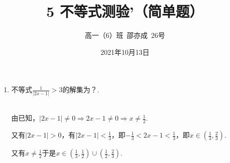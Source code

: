 \documentclass[8pt]{article}
\author{高一（6）班\ 邵亦成\ 26号}
\title{5 不等式测验'（简单题）}
\date{2021年10月13日}
\begin{document}
	\maketitle

	\begin{enumerate}
		
		\item
			不等式$\frac{1}{|2x-1|}>3$的解集为？.

			~\\
			由已知，$|2x-1|\neq 0 \Rightarrow 2x-1\neq0 \Rightarrow x\neq\frac{1}{2}.$

			又有$|2x-1|>0$，有$|2x-1|<\frac{1}{3}$，即$-\frac{1}{3}<2x-1<\frac{1}{3}$，即$x\in\left(\frac{1}{3},\frac{2}{3}\right)$.

			又有$x\neq\frac{1}{2}$于是$x\in\left(\frac{1}{3},\frac{1}{2}\right)\cup\left(\frac{1}{2},\frac{2}{3}\right).$

	\end{enumerate}
\end{document}
